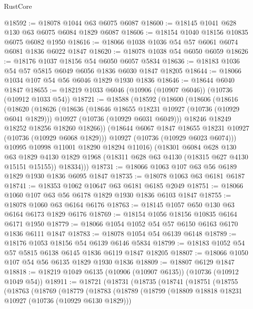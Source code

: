 \begin{lexlean}{RustCore}
\begin{coremodule}
@18592 := @18078 @1044 @63 @6075 @6087
@18600 := @18145 @1041 @628 @130 @63 @6075 @6084 @1829 @6087
@18606 := @18154 @1040 @18156 @10835 @6075 @6082 @1950
@18616 := @18066 @1038 @1036 @54 @57 @6061 @6074 @6081 @1836 @6022 @1847
@18620 := @18078 @1038 @54 @6050 @6059
@18626 := @18176 @1037 @18156 @54 @6050 @6057 @5834
@18636 := @18183 @1036 @54 @57 @5815 @6049 @6056 @1836 @6030 @1847 @18205
@18644 := @18066 @1034 @107 @54 @56 @6046 @1829 @1930 @1836
@18646 := @18644 @6040 @1847
@18655 := @18219 @1033 @6046 (@10906 (@10907 @6046)) (@10736 (@10912 @1033 @54))
@18721 := @18588
    (@18592
      (@18600
        (@18606
          (@18616
            (@18620
              (@18626
                (@18636
                  (@18646 @18655 @18231 @10927 (@10736 (@10929 @6041 @1829)))
                  @10927
                  (@10736 (@10929 @6031 @6049)))
                @18246
                @18249
                @18252
                @18256
                @18260
                @18266))
            (@18644 @6067 @1847 @18655 @18231 @10927 (@10736 (@10929 @6068 @1829)))
            @10927
            (@10736 (@10929 @6023 @6074)))
          @10995
          @10998
          @11001
          @18290
          @18294
          @11016)
        (@18301
          @6084
          @628
          @130
          @63
          @1829
          @4130
          @1829
          @1968
          (@18311 @628 @63 @4130 (@18315 @627 @4130 @15151 @15155))
          @18334)))
@18731 := @18066 @1063 @107 @63 @56 @6189 @1829 @1930 @1836 @6095 @1847
@18735 := @18078 @1063 @63 @6181 @6187
@18741 := @18353 @1062 @10647 @63 @6181 @6185 @2049
@18751 := @18066 @1060 @107 @63 @56 @6178 @1829 @1930 @1836 @6103 @1847
@18755 := @18078 @1060 @63 @6164 @6176
@18763 := @18145 @1057 @650 @130 @63 @6164 @6173 @1829 @6176
@18769 := @18154 @1056 @18156 @10835 @6164 @6171 @1950
@18779 := @18066 @1054 @1052 @54 @57 @6150 @6163 @6170 @1836 @6111 @1847
@18783 := @18078 @1054 @54 @6139 @6148
@18789 := @18176 @1053 @18156 @54 @6139 @6146 @5834
@18799 := @18183 @1052 @54 @57 @5815 @6138 @6145 @1836 @6119 @1847 @18205
@18807 := @18066 @1050 @107 @54 @56 @6135 @1829 @1930 @1836
@18809 := @18807 @6129 @1847
@18818 := @18219 @1049 @6135 (@10906 (@10907 @6135)) (@10736 (@10912 @1049 @54))
@18911 := @18721
    (@18731
      (@18735
        (@18741
          (@18751
            (@18755
              (@18763
                (@18769
                  (@18779
                    (@18783
                      (@18789
                        (@18799
                          (@18809 @18818 @18231 @10927 (@10736 (@10929 @6130 @1829)))

\end{coremodule}
\end{lexlean}
